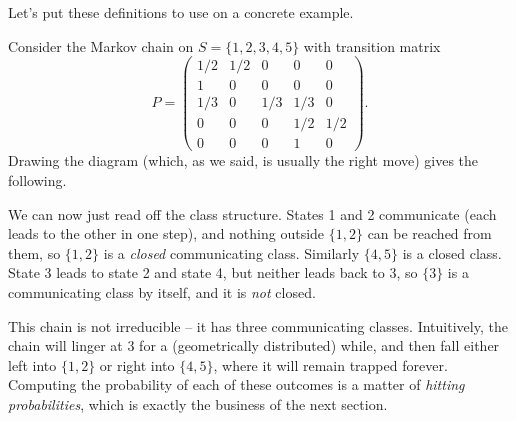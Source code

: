 Let's put these definitions to use on a concrete example.

\begin{example}
	Consider the Markov chain on $S = \{1, 2, 3, 4, 5\}$ with transition matrix
	$$
	P = \begin{pmatrix}
		1/2 & 1/2 & 0 & 0 & 0 \\
		1 & 0 & 0 & 0 & 0 \\
		1/3 & 0 & 1/3 & 1/3 & 0 \\
		0 & 0 & 0 & 1/2 & 1/2 \\
		0 & 0 & 0 & 1 & 0
	\end{pmatrix}.
	$$
	Drawing the diagram (which, as we said, is usually the right move) gives the following.

	\begin{center}
	\end{center}

	We can now just read off the class structure. States 1 and 2 communicate (each leads to the other in one step), and nothing outside $\{1, 2\}$ can be reached from them, so $\{1, 2\}$ is a \emph{closed} communicating class. Similarly $\{4, 5\}$ is a closed class. State 3 leads to state 2 and state 4, but neither leads back to 3, so $\{3\}$ is a communicating class by itself, and it is \emph{not} closed.

	This chain is not irreducible -- it has three communicating classes. Intuitively, the chain will linger at 3 for a (geometrically distributed) while, and then fall either left into $\{1, 2\}$ or right into $\{4, 5\}$, where it will remain trapped forever. Computing the probability of each of these outcomes is a matter of \emph{hitting probabilities}, which is exactly the business of the next section.
\end{example}

